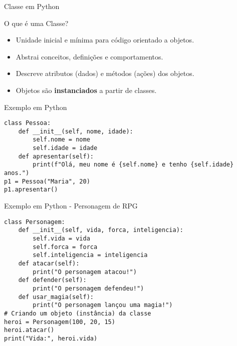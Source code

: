 \begin{frame}[fragile]{Classe em Python}

    \begin{block}{O que é uma Classe?}
        \begin{itemize}
            \item Unidade inicial e mínima para código orientado a objetos.
            \item Abstrai conceitos, definições e comportamentos.
            \item Descreve atributos (dados) e métodos (ações) dos objetos.
            \item Objetos são \textbf{instanciados} a partir de classes.
        \end{itemize}
    \end{block}

    \begin{block}{Exemplo em Python}
        \begin{verbatim}
class Pessoa:
    def __init__(self, nome, idade):
        self.nome = nome
        self.idade = idade
    def apresentar(self):
        print(f"Olá, meu nome é {self.nome} e tenho {self.idade} anos.")
p1 = Pessoa("Maria", 20)
p1.apresentar()
\end{verbatim}
    \end{block}

\end{frame}

\begin{frame}[fragile]{Exemplo em Python - Personagem de RPG}

    \begin{verbatim}
class Personagem:
    def __init__(self, vida, forca, inteligencia):
        self.vida = vida
        self.forca = forca
        self.inteligencia = inteligencia
    def atacar(self):
        print("O personagem atacou!")
    def defender(self):
        print("O personagem defendeu!")
    def usar_magia(self):
        print("O personagem lançou uma magia!")
# Criando um objeto (instância) da classe
heroi = Personagem(100, 20, 15)
heroi.atacar()
print("Vida:", heroi.vida)
\end{verbatim}

\end{frame}


